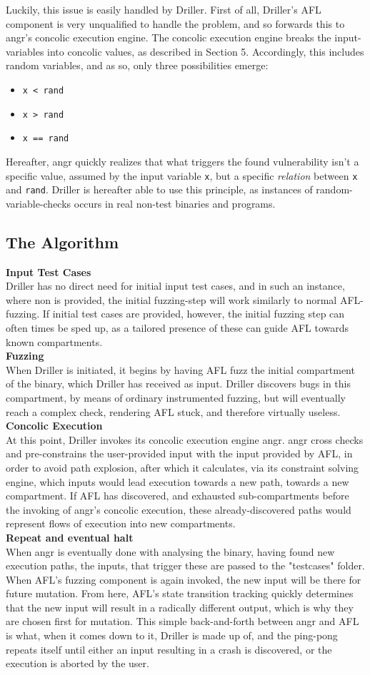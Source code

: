 \documentclass[a4paper]{article}
\newcommand{\tbf}[1]{\textbf{#1}}
\newcommand{\tit}[1]{\textit{#1}}
\newcommand{\ttt}[1]{\texttt{#1}}
\newcommand{\subsubsubsection}[1]{\tbf{#1}\\}
\begin{document}
Luckily, this issue is easily handled by Driller. First of all, Driller's AFL component is very unqualified to handle the problem, and so forwards this to angr's concolic execution engine. The concolic execution engine breaks the input-variables into concolic values, as described in Section 5. Accordingly, this includes random variables, and as so, only three possibilities emerge:
\begin{itemize}[noitemsep]
	\item \ttt{x < rand}
	\item \ttt{x > rand}
	\item \ttt{x == rand}
\end{itemize}
Hereafter, angr quickly realizes that what triggers the found vulnerability isn't a specific value, assumed by the input variable \ttt{x}, but a specific \tit{relation} between \ttt{x} and \ttt{rand}. Driller is hereafter able to use this principle, as instances of random-variable-checks occurs in real non-test binaries and programs.
\subsection{The Algorithm}
\subsubsubsection{Input Test Cases}
Driller has no direct need for initial input test cases, and in such an instance, where non is provided, the initial fuzzing-step will work similarly to normal AFL-fuzzing. If initial test cases are provided, however, the initial fuzzing step can often times be sped up, as a tailored presence of these can guide AFL towards known compartments.\\
\subsubsubsection{Fuzzing}
When Driller is initiated, it begins by having AFL fuzz the initial compartment of the binary, which Driller has received as input. Driller discovers bugs in this compartment, by means of ordinary instrumented fuzzing, but will eventually reach a complex check, rendering AFL stuck, and therefore virtually useless.\\
\subsubsubsection{Concolic Execution}
At this point, Driller invokes its concolic execution engine angr. angr cross checks and pre-constrains the user-provided input with the input provided by AFL, in order to avoid path explosion, after which it calculates, via its constraint solving engine, which inputs would lead execution towards a new path, towards a new compartment. If AFL has discovered, and exhausted sub-compartments before the invoking of angr's concolic execution, these already-discovered paths would represent flows of execution into new compartments.\\
\subsubsubsection{Repeat and eventual halt}
When angr is eventually done with analysing the binary, having found new execution paths, the inputs, that trigger these are passed to the "testcases" folder. When AFL's fuzzing component is again invoked, the new input will be there for future mutation. From here, AFL's state transition tracking quickly determines that the new input will result in a radically different output, which is why they are chosen first for mutation. This simple back-and-forth between angr and AFL is what, when it comes down to it, Driller is made up of, and the ping-pong repeats itself until either an input resulting in a crash is discovered, or the execution is aborted by the user. 
\end{document}
